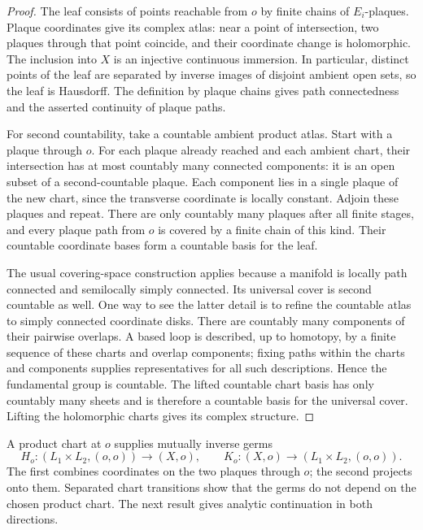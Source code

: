 \begin{proof}
The leaf consists of points reachable from \(o\) by finite chains of
\(E_i\)-plaques. Plaque coordinates give its complex atlas: near a
point of intersection, two plaques through that point coincide, and
their coordinate change is holomorphic. The inclusion into \(X\) is
an injective continuous immersion. In particular, distinct points of
the leaf are separated by inverse images of disjoint ambient open sets,
so the leaf is Hausdorff. The definition by plaque chains gives path
connectedness and the asserted continuity of plaque paths.

For second countability, take a countable ambient product atlas. Start
with a plaque through \(o\). For each plaque already reached and each
ambient chart, their intersection has at most countably many connected
components: it is an open subset of a second-countable plaque. Each
component lies in a single plaque of the new chart, since the transverse
coordinate is locally constant. Adjoin these plaques and repeat.
There are only countably many plaques after all finite stages, and
every plaque path from \(o\) is covered by a finite chain of this
kind. Their countable coordinate bases form a countable basis for the
leaf.

The usual covering-space construction applies because a manifold is
locally path connected and semilocally simply connected. Its universal
cover is second countable as well. One way to see the latter detail is
to refine the countable atlas to simply connected coordinate disks.
There are countably many components of their pairwise overlaps. A
based loop is described, up to homotopy, by a finite sequence of these
charts and overlap components; fixing paths within the charts and
components supplies representatives for all such descriptions. Hence
the fundamental group is countable. The lifted countable chart basis
has only countably many sheets and is therefore a countable basis for
the universal cover. Lifting the holomorphic charts gives its complex
structure.
\end{proof}

A product chart at \(o\) supplies mutually inverse germs
\[
 H_o:(L_1\times L_2,(o,o))\longrightarrow(X,o),
 \qquad
 K_o:(X,o)\longrightarrow(L_1\times L_2,(o,o)).
\]
The first combines coordinates on the two plaques through \(o\); the
second projects onto them. Separated chart transitions show that the
germs do not depend on the chosen product chart. The next result gives
analytic continuation in both directions.

